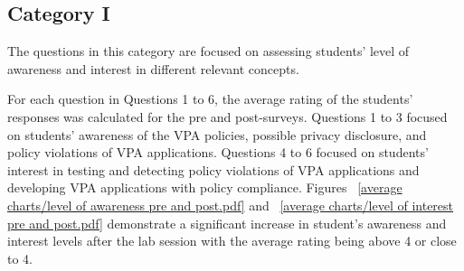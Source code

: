 \documentclass{article}
\begin{document}
\subsection{Category I}

The questions in this category are focused on assessing students' level of awareness and interest in different relevant concepts. 

For each question in Questions 1 to 6, the average rating of the students' responses was calculated for the pre and post-surveys. Questions 1 to 3 focused on students' awareness of the VPA policies, possible privacy disclosure, and policy violations of VPA applications. Questions 4 to 6 focused on students' interest in testing and detecting policy violations of VPA applications and developing VPA applications with policy compliance. Figures ~\ref{average charts/level of awareness pre and post.pdf} and ~\ref{average charts/level of interest pre and post.pdf} demonstrate a significant increase in student's awareness and interest levels after the lab session with the average rating being above 4 or close to 4. 
\end{document}
